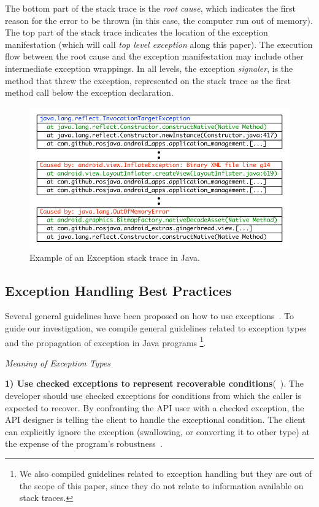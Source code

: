\documentclass[conference]{IEEEtran}
\begin{document}
The bottom part of the stack trace is the \emph{root cause}, which indicates the first reason for the error to be thrown (in this case, the computer run out of memory). The top part of the stack trace indicates the location of the exception manifestation (which will call \emph{top level exception} along this paper). The execution flow  between the root cause and the exception manifestation may include other intermediate exception wrappings. In all levels, the exception \emph{signaler}, is the method that threw the exception, represented on the stack trace as the first method call below the exception declaration.

\begin{figure}
\centering
\includegraphics[scale=0.6]{wrappings}
\caption{Example of an Exception stack trace in Java.}
\label{fig:wrapping}
\end{figure}

\subsection{Exception Handling Best Practices}
\label{sec:best}
Several general guidelines have been proposed on how to use exceptions~\cite{mandrioli1992advances,gosling2000java,wirfs2006toward, bloch2008effective}. To guide our investigation, we compile general guidelines related to exception types and the propagation of exception in Java programs \footnote{We also compiled guidelines related to exception handling but they are out of the scope of this paper, since they do not relate to information available on stack traces.}. 

\noindent\emph{Meaning of Exception Types}

\textbf{1) Use checked exceptions to represent recoverable conditions}(~\cite{mandrioli1992advances,gosling2000java,wirfs2006toward,bloch2008effective}). The developer should use checked exceptions for conditions from which the caller is expected to recover. By confronting the API user with a checked exception, the API designer is telling the client to handle the exceptional condition. The client can explicitly ignore the exception (swallowing, or converting it to other type) at
the expense of the program's robustness~\cite{gosling2000java}. 
\end{document}

